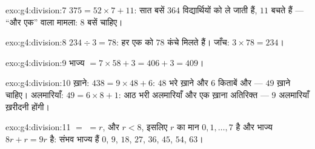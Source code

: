 \begin{solution}{exo:g4:division:7}
$375 = 52 \times 7 + 11$: सात बसें $364$ विद्यार्थियों को ले
जाती हैं, $11$ बचते हैं --- ``और एक'' वाला मामला: $8$ बसें चाहिए।
\end{solution}

\begin{solution}{exo:g4:division:8}
$234 \div 3 = 78$: हर एक को $78$ कंचे मिलते हैं। जाँच:
$3 \times 78 = 234$।
\end{solution}

\begin{solution}{exo:g4:division:9}
भाज्य $= 7 \times 58 + 3 = 406 + 3 = 409$।
\end{solution}

\begin{solution}{exo:g4:division:10}
ख़ाने: $438 = 9 \times 48 + 6$: $48$ भरे ख़ाने और $6$ किताबें
और --- $49$ ख़ाने चाहिए। अलमारियाँ:
$49 = 6 \times 8 + 1$: आठ भरी अलमारियाँ और एक ख़ाना अतिरिक्त ---
$9$ अलमारियाँ ख़रीदनी होंगी।
\end{solution}

\begin{solution}{exo:g4:division:11}
 $=$  $= r$, और $r < 8$, इसलिए $r$ का मान
$0, 1, \dots, 7$ है और भाज्य $8r + r = 9r$ है: संभव भाज्य हैं
$0$, $9$, $18$, $27$, $36$, $45$, $54$, $63$।

\end{solution}
